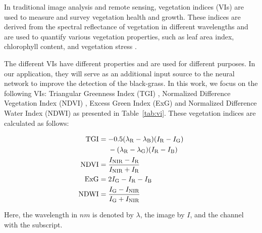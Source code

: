 \documentclass{ieeeaccess}
\begin{document}
In traditional image analysis and remote sensing, vegetation indices (VIs) are used to measure and survey vegetation health and growth. These indices are derived from the spectral reflectance of vegetation in different wavelengths and are used to quantify various vegetation properties, such as leaf area index, chlorophyll content, and vegetation stress \cite{fang2008leaf}. 

The different VIs have different properties and are used for different purposes. In our application, they will serve as an additional input source to the neural network to improve the detection of the black-grass. In this work, we focus on the following VIs: Triangular Greenness Index (TGI) \cite{hunt2011remote}, Normalized Difference Vegetation Index (NDVI) \cite{pettorelli2013}, Excess Green Index (ExG) \cite{woebbecke1995color} and Normalized Difference Water Index (NDWI) \cite{gao1996ndwi} as presented in Table~\ref{tab:vi}. These vegetation indices are calculated as follows:

\begin{align}
\text{TGI} &= -0.5 (\lambda_\text{R} - \lambda_\text{B})(I_{\text{R}} - I_{\text{G}}) \notag \\
& \quad \ -(\lambda_\text{R} - \lambda_\text{G})(I_{\text{R}} - I_{\text{B}}) \\
\text{NDVI} &= \frac{I_{\text{NIR}} - I_{\text{R}}}{I_{\text{NIR}} + I_{\text{R}}} \\
\text{ExG} &= 2I_{\text{G}} - I_{\text{R}} - I_{\text{B}} \\
\text{NDWI} &= \frac{I_{\text{G}} - I_{\text{NIR}}}{I_{\text{G}} + I_{\text{NIR}}}
\end{align}


Here, the wavelength in $nm$ is denoted by $\lambda$, the image by $I$, and the channel with the subscript.

\setlength{\defaulttabcolsep}{\tabcolsep} 

\setlength{\tabcolsep}{3pt} 
\setlength{\tabcolsep}{3pt} 
\begin{table}[t]
    \centering
    \caption{Vegetation indices with their respective spectral bands.}
    \label{tab:vi}
\end{table}
\end{document}
